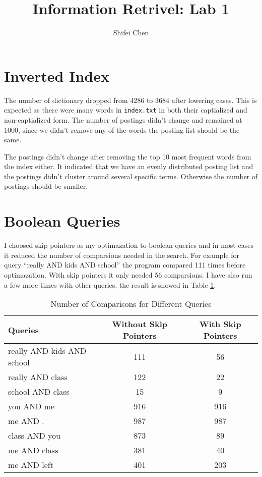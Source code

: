 \documentclass[11pt]{article} %
\title{{\LARGE Information Retrivel: Lab 1}\\[1.5mm]} %
\author{Shifei Chen} %
\begin{document}
\maketitle

\section{Inverted Index}

The number of dictionary dropped from 4286 to 3684 after lowering cases. This is expected as there were many words in \verb|index.txt| in both their captialized and non-captialized form. The number of postings didn't change and remained at 1000, since we didn't remove any of the words the posting list should be the same.

The postings didn't change after removing the top 10 most frequent words from the index either. It indicated that we have an evenly distributed posting list and the postings didn't cluster around several specific terms. Otherwise the number of postings should be smaller.

\section{Boolean Queries}

I choosed skip pointers as my optimazation to boolean queries and in most cases it reduced the number of comparsions needed in the search. For example for query ``really AND kids AND school'' the program compared 111 times before optimazation. With skip pointers it only needed 56 comparsions. I have also run a few more times with other queries, the result is showed in Table \ref{tab:table1}.

\begin{table}[h]
    \begin{center}
        \caption{Number of Comparisons for Different Queries}
        \label{tab:table1}
        \begin{tabular}{l|c|c}
            \textbf{Queries} & \textbf{Without Skip Pointers} & \textbf{With Skip Pointers}\\
            \hline
            really AND kids AND school & 111 & 56\\
            really AND class & 122 & 22\\
            school AND class & 15 & 9\\
            you AND me & 916 & 916\\
            me AND . & 987 & 987\\
            class AND you & 873 & 89\\
            me AND class & 381 & 40\\
            me AND left & 401 & 203\\
        \end{tabular}
    \end{center}
\end{table}
\end{document}
